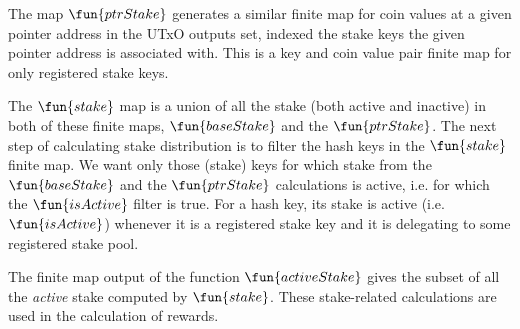 The map
$\fun{ptrStake}$ generates a similar finite map for coin values at a given
pointer address in the UTxO outputs set, indexed the stake keys the given
pointer address is associated with.
This is a key and coin value pair finite map for only registered stake keys.

The $\fun{stake}$ map is a union of all the stake (both active and inactive) in
both of these finite
maps, $\fun{baseStake}$ and the $\fun{ptrStake}$.
The next step of calculating stake distribution is to filter the hash keys in
the $\fun{stake}$ finite map.
We want only those (stake) keys for which stake
from the $\fun{baseStake}$ and the $\fun{ptrStake}$ calculations is active, i.e.
for which the $\fun{isActive}$ filter is true.
For a hash key, its stake is active (i.e. $\fun{isActive}$) whenever it is a
registered stake key
and it is delegating to some registered stake pool.

The finite map output of the function $\fun{activeStake}$ gives the subset of
all the \textit{active} stake computed by $\fun{stake}$.
These stake-related calculations are used in the calculation of rewards.

